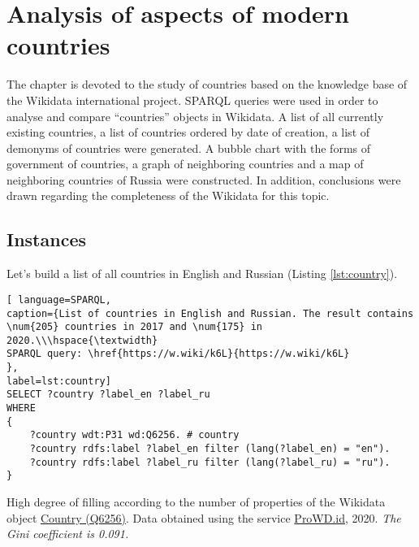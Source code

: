 \setchapterpreamble[u]{\margintoc}
\chapter{Analysis of aspects of modern countries\protect\footnotemark}


The chapter is devoted to the study of countries based on the knowledge base of the Wikidata international project. SPARQL queries were used in order to analyse and compare ``countries'' objects in Wikidata. A list of all currently existing countries, a list of countries ordered by date of creation, a list of demonyms of countries were generated. A bubble chart with the forms of government of countries, a graph of neighboring countries and a map of neighboring countries of Russia were constructed. In addition, conclusions were drawn regarding the completeness of the Wikidata for this topic.

\section{Instances}

Let's build a list of all countries in English and Russian (Listing \ref{lst:country}).

\begin{lstlisting}[ language=SPARQL, 
caption={List of countries in English and Russian. The result contains \num{205} countries in 2017 and \num{175} in 2020.\\\hspace{\textwidth}
SPARQL query: \href{https://w.wiki/k6L}{https://w.wiki/k6L}
},
label=lst:country]
SELECT ?country ?label_en ?label_ru
WHERE
{
	?country wdt:P31 wd:Q6256. # country
	?country rdfs:label ?label_en filter (lang(?label_en) = "en").
	?country rdfs:label ?label_ru filter (lang(?label_ru) = "ru").
}
\end{lstlisting}


\begin{marginfigure}[0.0cm]
	{
		\setlength{\fboxsep}{0pt}%
		\setlength{\fboxrule}{1pt}%
	}
	\caption{
		High degree of filling according to the number of properties of the Wikidata object \href{https://www.wikidata.org/wiki/Q6256}{Country (Q6256)}.  
		Data obtained using the service \href{https://prowd.id/dashboards/86b6f91a8131/profile}{ProWD.id}, 2020. \emph{The Gini coefficient is 0.091.}
	}%
	\label{fig:ProWD_country}%
\end{marginfigure}

